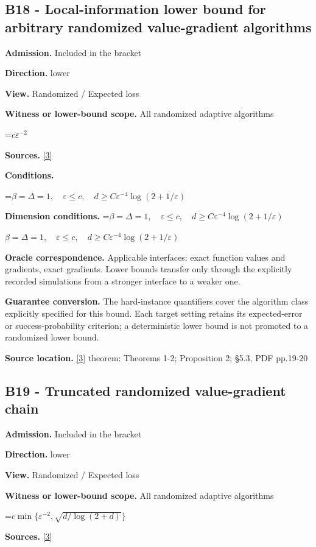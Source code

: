 \documentclass[10pt,a4paper]{article}
\newcommand{\AtlasMath}[1]{\par\begingroup\centering\setbox0=\hbox{$\displaystyle #1$}\ifdim\wd0>1.4\linewidth\typeout{ATLAS WIDE FORMULA: \the\wd0}\fi\ifdim\wd0>\linewidth\resizebox{\linewidth}{!}{\box0}\else\box0\fi\par\endgroup}
\newcommand{\AtlasInlineMath}[1]{\begingroup\setbox0=\hbox{$#1$}\ifdim\wd0>.4\linewidth\endgroup\AtlasMath{#1}\else\endgroup$#1$\fi}
\begin{document}
\subsection{B18 - Local-information lower bound for arbitrary randomized value-gradient algorithms}
\textbf{Admission.} Included in the bracket

\textbf{Direction.} lower

\textbf{View.} Randomized / Expected loss

\textbf{Witness or lower-bound scope.} All randomized adaptive algorithms

\AtlasMath{c\varepsilon^{-2}}
\textbf{Sources.} \href{https://arxiv.org/pdf/1710.11606}{[3]}

\textbf{Conditions.} 
\AtlasMath{\beta=\Delta=1,\quad\varepsilon\le c,\quad d\ge C\varepsilon^{-4}\log(2+1/\varepsilon)}


\textbf{Dimension conditions.} \AtlasInlineMath{\beta=\Delta=1,\quad\varepsilon\le c,\quad d\ge C\varepsilon^{-4}\log(2+1/\varepsilon)}

\textbf{Oracle correspondence.} Applicable interfaces: exact function values and gradients, exact gradients. Lower bounds transfer only through the explicitly recorded simulations from a stronger interface to a weaker one.

\textbf{Guarantee conversion.} The hard-instance quantifiers cover the algorithm class explicitly specified for this bound. Each target setting retains its expected-error or success-probability criterion; a deterministic lower bound is not promoted to a randomized lower bound.

\textbf{Source location.} \href{https://arxiv.org/pdf/1710.11606}{[3]} theorem: Theorems 1-2; Proposition 2; §5.3, PDF pp.19-20

\subsection{B19 - Truncated randomized value-gradient chain}
\textbf{Admission.} Included in the bracket

\textbf{Direction.} lower

\textbf{View.} Randomized / Expected loss

\textbf{Witness or lower-bound scope.} All randomized adaptive algorithms

\AtlasMath{c\min\{\varepsilon^{-2},\sqrt{d/\log(2+d)}\}}
\textbf{Sources.} \href{https://arxiv.org/pdf/1710.11606}{[3]}
\end{document}
